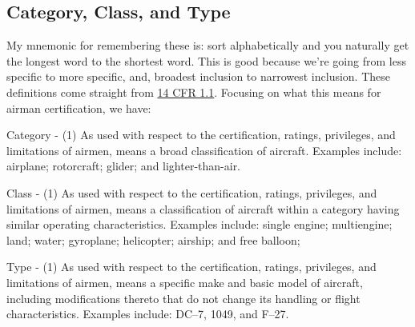 \subsection{Category, Class, and Type}

My mnemonic for remembering these is: sort alphabetically and you naturally get the longest word to the shortest word. This is good because we're going from less specific to more specific, and, broadest inclusion to narrowest inclusion. These definitions come straight from \href{https://www.ecfr.gov/current/title-14/chapter-I/subchapter-A/part-1/section-1.1}{14 CFR 1.1}. Focusing on what this means for airman certification, we have:

Category - (1) As used with respect to the certification, ratings, privileges, and limitations of airmen, means a broad classification of aircraft. Examples include: airplane; rotorcraft; glider; and lighter-than-air.

Class - (1) As used with respect to the certification, ratings, privileges, and limitations of airmen, means a classification of aircraft within a category having similar operating characteristics. Examples include: single engine; multiengine; land; water; gyroplane; helicopter; airship; and free balloon; 

Type - (1) As used with respect to the certification, ratings, privileges, and limitations of airmen, means a specific make and basic model of aircraft, including modifications thereto that do not change its handling or flight characteristics. Examples include: DC–7, 1049, and F–27. 








